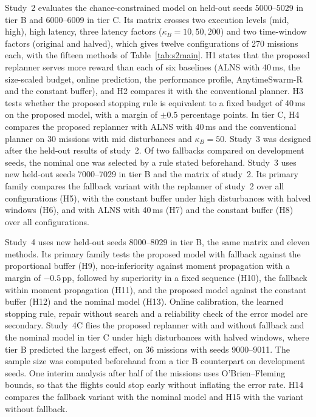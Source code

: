 Study~2 evaluates the chance-constrained model on held-out seeds 5000--5029 in tier B and 6000--6009 in tier C. Its
matrix crosses two execution levels (mid, high), high latency, three latency factors ($\kappa_B=10, 50, 200$) and two
time-window factors (original and halved), which gives twelve configurations of 270 missions each, with the fifteen
methods of Table~\ref{tab:s2main}. H1 states that the proposed replanner serves more reward than each of six baselines
(ALNS with 40\,ms, the size-scaled budget, online prediction, the performance profile, AnytimeSwarm-R and the constant
buffer), and H2 compares it with the conventional planner. H3 tests whether the proposed stopping rule is equivalent to
a fixed budget of 40\,ms on the proposed model, with a margin of $\pm0.5$ percentage points. In tier C, H4 compares the
proposed replanner with ALNS with 40\,ms and the conventional planner on 30 missions with mid disturbances and
$\kappa_B=50$. Study~3 was designed after the held-out results of study~2. Of two fallbacks compared on development
seeds, the nominal one was selected by a rule stated beforehand. Study~3 uses new held-out seeds 7000--7029 in tier B
and the matrix of study~2. Its primary family compares the fallback variant with the replanner of study~2 over all
configurations (H5), with the constant buffer under high disturbances with halved windows (H6), and with ALNS with
40\,ms (H7) and the constant buffer (H8) over all configurations.

Study~4 uses new held-out seeds 8000--8029 in tier B, the same matrix and eleven methods. Its primary family tests the
proposed model with fallback against the proportional buffer (H9), non-inferiority against moment propagation with a
margin of $-0.5$\,pp, followed by superiority in a fixed sequence (H10), the fallback within moment propagation (H11),
and the proposed model against the constant buffer (H12) and the nominal model (H13). Online calibration, the learned
stopping rule, repair without search and a reliability check of the error model are secondary. Study~4C flies the
proposed replanner with and without fallback and the nominal model in tier C under high disturbances with halved
windows, where tier B predicted the largest effect, on 36 missions with seeds 9000--9011. The sample size was computed
beforehand from a tier B counterpart on development seeds. One interim analysis after half of the missions uses
O'Brien--Fleming bounds, so that the flights could stop early without inflating the error rate. H14 compares the
fallback variant with the nominal model and H15 with the variant without fallback.

